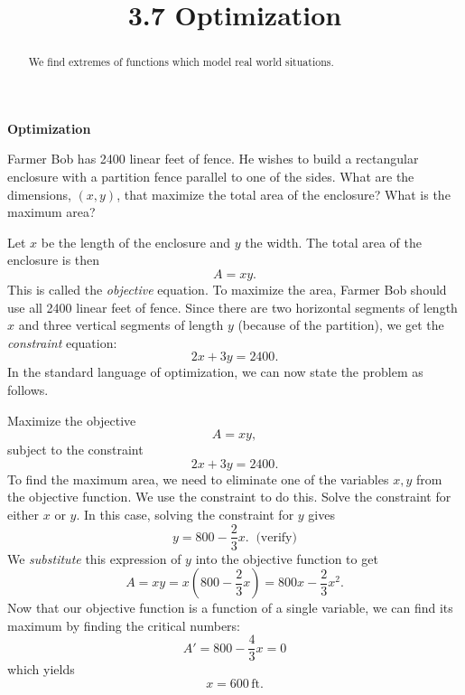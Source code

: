 \documentclass{ximera}
\title{3.7 Optimization}
\begin{document}
\begin{abstract}
We find extremes of functions which model real world situations.
\end{abstract}

\maketitle

\begin{center}
\textbf{Optimization}
\end{center}
 

\begin{example}[example 1]
Farmer Bob has 2400 linear feet of fence. He wishes to build a rectangular enclosure with a partition fence parallel to one of the sides.  
What are the dimensions, $(x,y)$, that maximize the total area of the enclosure? What is the maximum area?


\begin{center}
\end{center}
Let $x$ be the length of the enclosure and $y$ the width.  The total area of the enclosure is then
\[A= xy.\]
This is called the {\it objective} equation.
To maximize the area, Farmer Bob should use all 2400 linear feet of fence.  Since there are two horizontal segments of length $x$ and three vertical segments of length $y$ (because of the partition), we get the {\it constraint} equation:
\[2x+3y=2400.\]
In the standard language of optimization, we can now state the problem as follows.

Maximize the objective
\[A = xy,\]
subject to the constraint 
\[2x+3y = 2400.\]
To find the maximum area, we need to eliminate one of the variables $x, y$ from the objective function.
We use the constraint to do this.  Solve the constraint for either $x$ or $y$.
In this case, solving the constraint for $y$ gives
\[y = 800 - \frac23 x. \;\; \text{(verify)}\]
We {\it substitute} this expression of $y$ into the objective function to get 
\[A = xy = x(800 - \frac23 x) = 800x - \frac23 x^2.\]
Now that our objective function is a function of a single variable, we can find its maximum by finding the critical numbers:
\[A' = 800 - \frac43 x = 0 \]
which yields
\[x= 600 \,\mbox{ft.}\]


\end{example}
\end{document}
